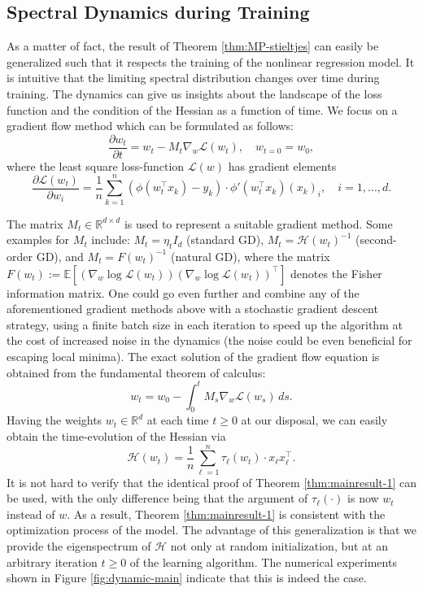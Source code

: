 \documentclass{article}
\begin{document}
\subsection{Spectral Dynamics during Training}\label{sec:training}
As a matter of fact, the result of Theorem \ref{thm:MP-stieltjes} can easily be generalized such that it respects the training of the nonlinear regression model. It is intuitive that the limiting spectral distribution changes over time during training. The dynamics can give us insights about the landscape of the loss function and the condition of the Hessian as a function of time. We focus on a gradient flow method which can be formulated as follows:
\begin{equation}
\frac{\partial w_t}{\partial t} = w_t-M_t\nabla_w\mathcal{L}(w_t),\quad w_{t=0}=w_0,
\end{equation}
where the least square loss-function $\mathcal{L}(w)$ has gradient elements
\begin{equation}
\frac{\partial\mathcal{L}(w_t)}{\partial w_i}=\frac{1}{n}\sum_{k=1}^n(\phi(w_t^\top x_k)-y_k)\cdot\phi'(w_t^\top x_k)(x_k)_i,\quad i=1,\dots, d.
\end{equation}
\par
The matrix $M_t\in\mathbb{R}^{d\times d}$ is used to represent a suitable gradient method. Some examples for $M_t$ include: $M_t=\eta_tI_d$ (standard GD), $M_t=\mathcal{H}(w_t)^{-1}$ (second-order GD), and $M_t=F(w_t)^{-1}$ (natural GD), where the matrix
$F(w_t):=\mathbb{E}\left[(\nabla_w\log \mathcal{L}(w_t))(\nabla_w\log \mathcal{L}(w_t))^\top \right]$ denotes the Fisher information matrix. One could go even further and combine any of the aforementioned gradient methods above with a stochastic gradient descent strategy, using a finite batch size in each iteration to speed up the algorithm at the cost of increased noise in the dynamics (the noise could be even beneficial for escaping local minima). The exact solution of the gradient flow equation is obtained from the fundamental theorem of calculus:
\begin{equation}
w_t=w_0-\int_0^t M_s\nabla_w\mathcal{L}(w_s)\,ds.\label{eq:GD1}
\end{equation}
Having the weights $w_t\in\mathbb{R}^d$ at each time $t\geq0$ at our disposal, we can easily obtain the time-evolution of the Hessian via
\begin{equation}
\mathcal{H}(w_t)=\frac{1}{n}\sum_{\ell=1}^n\tau_\ell(w_t)\cdot x_\ell x_\ell^\top.
\end{equation}
It is not hard to verify that the identical proof of Theorem \ref{thm:mainresult-1} can be used, with the only difference being that the argument of $\tau_\ell(\cdot)$ is now $w_t$ instead of $w$. As a result, Theorem \ref{thm:mainresult-1} is consistent with the optimization process of the model. The advantage of this generalization is that we provide the eigenspectrum of $\mathcal{H}$ not only at random initialization, but at an arbitrary iteration $t\geq0$ of the learning algorithm. The numerical experiments shown in Figure \ref{fig:dynamic-main} indicate that this is indeed the case.
\end{document}
